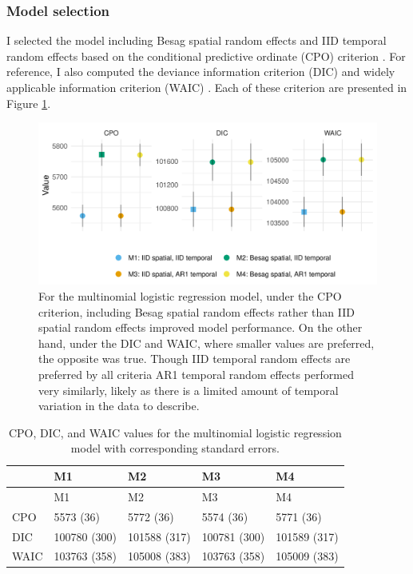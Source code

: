 \documentclass[a4paper, nobind]{templates/ociamthesis}
\begin{document}
\hypertarget{model-selection}{%
\subsubsection{Model selection}\label{model-selection}}

I selected the model including Besag spatial random effects and IID temporal random effects based on the conditional predictive ordinate (CPO) criterion \autocite{pettit1990conditional}.
For reference, I also computed the deviance information criterion (DIC) \autocite{spiegelhalter2002bayesian} and widely applicable information criterion (WAIC) \autocite{watanabe2013widely}.
Each of these criterion are presented in Figure \ref{fig:model-comparison}.



\begin{figure}

{\centering \includegraphics[width=0.95\linewidth]{resources/multi-agyw/20230627-144735-3da88508/depends/model-comparison} 

}

\caption{For the multinomial logistic regression model, under the CPO criterion, including Besag spatial random effects rather than IID spatial random effects improved model performance. On the other hand, under the DIC and WAIC, where smaller values are preferred, the opposite was true. Though IID temporal random effects are preferred by all criteria AR1 temporal random effects performed very similarly, likely as there is a limited amount of temporal variation in the data to describe.}\label{fig:model-comparison}
\end{figure}

\begin{longtable}[]{@{}lllll@{}}
\caption{\label{tab:model-comparison} CPO, DIC, and WAIC values for the multinomial logistic regression model with corresponding standard errors.}\tabularnewline
\toprule\noalign{}
& M1 & M2 & M3 & M4 \\
\midrule\noalign{}
\endfirsthead
\toprule\noalign{}
& M1 & M2 & M3 & M4 \\
\midrule\noalign{}
\endhead
\bottomrule\noalign{}
\endlastfoot
CPO & 5573 (36) & 5772 (36) & 5574 (36) & 5771 (36) \\
DIC & 100780 (300) & 101588 (317) & 100781 (300) & 101589 (317) \\
WAIC & 103763 (358) & 105008 (383) & 103763 (358) & 105009 (383) \\
\end{longtable}
\end{document}
